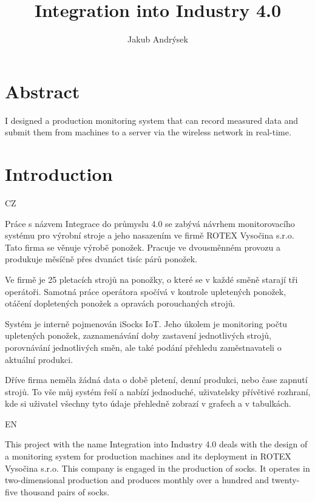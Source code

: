 \documentclass[12pt, a4paper]{article}
\title{Integration into Industry 4.0}
\author{Jakub Andrýsek}
\date{}
\begin{document}

\maketitle

\section*{Abstract}
I designed a production monitoring system that can record measured data and submit them from machines to a server via the wireless network in real-time.



\section*{Introduction}

CZ

Práce s názvem Integrace do průmyslu 4.0 se zabývá návrhem monitorovacího systému pro výrobní stroje a jeho nasazením ve firmě ROTEX Vysočina s.r.o.
Tato firma se věnuje výrobě ponožek.
Pracuje ve dvousměnném provozu a produkuje měsíčně přes dvanáct tisíc párů ponožek.

Ve firmě je 25 pletacích strojů na ponožky, o které se v každé směně starají tři operátoři.
Samotná práce operátora spočívá v kontrole upletených ponožek, otáčení dopletených ponožek a opravách porouchaných strojů.

Systém je interně pojmenován iSocks IoT.
Jeho úkolem je monitoring počtu upletených ponožek, zaznamenávání doby zastavení jednotlivých strojů, porovnávání jednotlivých směn, ale také podání přehledu zaměstnavateli o aktuální produkci.

Dříve firma neměla žádná data o době pletení, denní  produkci, nebo čase zapnutí strojů.
To vše  můj systém řeší  a nabízí jednoduché, uživatelsky přívětivé rozhraní, kde si uživatel všechny tyto údaje přehledně zobrazí v grafech a v tabulkách.

EN

This project with the name Integration into Industry 4.0 deals with the design of a monitoring system for production machines and its deployment in ROTEX Vysočina s.r.o.
This company is engaged in the production of socks.
It operates in two-dimensional production and produces monthly over a hundred and twenty-five thousand pairs of socks.
\end{document}
